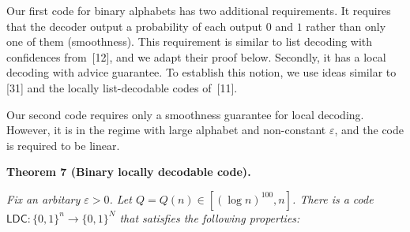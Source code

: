 Our first code for binary alphabets has two additional requirements. It requires that the decoder output a probability of each output $0$ and $1$ rather than only one of them (smoothness). This requirement is similar to list decoding with confidences from [12], and we adapt their proof below. Secondly, it has a local decoding with advice guarantee. To establish this notion, we use ideas similar to [31] and the locally list-decodable codes of [11].\par




Our second code requires only a smoothness guarantee for local decoding. However, it is in the regime with large alphabet and non-constant $\varepsilon$, and the code is required to be linear.\par





\par\medskip\noindent\textbf{
\textbf{Theorem 7}\textbf{ }(Binary locally decodable code)\textbf{.}
}\par



\emph{Fix an arbitary $\varepsilon>0$. Let $Q=Q(n)\in[(\log n)^{100},n]$. There is a code $\mathsf{LDC}:\{0,1\}^{n}\rightarrow\{0,1\}^{N}$
that satisfies the following properties:}\par


